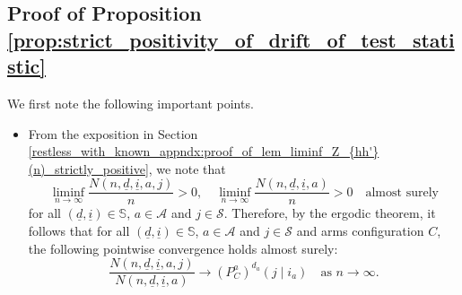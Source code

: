 \subsection{Proof of Proposition \ref{prop:strict_positivity_of_drift_of_test_statistic}}
\label{appndx:proof_of_prop_strict_positivity_of_drift_of_test_statistic}
We first note the following important points.
\begin{itemize}
	\item From the exposition in Section \ref{restless_with_known_appndx:proof_of_lem_liminf_Z_{hh'}(n)_strictly_positive}, we note that
	\begin{equation}
		\liminf\limits_{n \to \infty} \frac{N(n, \underline{d}, \underline{i}, a, j)}{n} > 0, \quad \liminf\limits_{n \to \infty} \frac{N(n, \underline{d}, \underline{i}, a)}{n} > 0 \quad \text{almost surely}
		\label{eq:liminf_of_two_qts_strictly_positive}
	\end{equation}
	for all $(\underline{d}, \underline{i})\in \mathbb{S}$, $a\in \mathcal{A}$ and $j\in \mathcal{S}$.
	 Therefore, by the ergodic theorem, it follows that for all $(\underline{d}, \underline{i})\in \mathbb{S}$, $a\in \mathcal{A}$ and $j\in \mathcal{S}$ and arms configuration $C$, the following pointwise convergence holds almost surely:
	\begin{equation}
		\frac{N(n, \underline{d}, \underline{i}, a, j)}{N(n, \underline{d}, \underline{i}, a)} \longrightarrow (P_C^a)^{d_a}(j\mid i_a)\quad \text{as }n\to \infty.
		\label{eq:convergence_for_each_d_i_ergodic_theorem}
	\end{equation}


\end{itemize}

